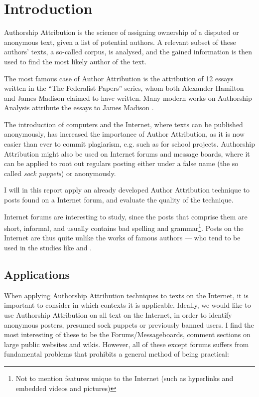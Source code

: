 \section{Introduction}
\label{introduction}
Authorship Attribution is the science of assigning ownership of a disputed or anonymous text, given a list of potential authors. A relevant subset of these authors' texts, a so-called corpus, is analysed, and the gained information is then used to find the most likely author of the text.

The most famous case of Author Attribution is the attribution of 12 essays written in the ``The Federalist Papers'' series, whom both Alexander Hamilton and James Madison claimed to have written. Many modern works on Authorship Analysis attribute the essays to James Madison \cite{Fung03thedisputed}.

The introduction of computers and the Internet, where texts can be published anonymously, has increased the importance of Author Attribution, as it is now easier than ever to commit plagiarism, e.g. such as for school projects. Authorship Attribution might also be used on Internet forums and message boards, where it can be applied to root out regulars posting either under a false name (the so called \emph{sock puppets}) or anonymously.

I will in this report apply an already developed Author Attribution technique to posts found on a Internet forum, and evaluate the quality of the technique.

Internet forums are interesting to study, since the posts that comprise them are short, informal, and usually contains bad spelling and grammar\footnote{Not to mention features unique to the Internet (such as hyperlinks and embedded videos and pictures)}. Posts on the Internet are thus quite unlike the works of famous authors --- who tend to be used in the studies like \cite{nr4} and \cite{nr2}.  

\subsection{Applications}
When applying Authorship Attribution techniques to texts on the Internet, it is important to consider in which contexts it is applicable. Ideally, we would like to use Authorship Attribution on all text on the Internet, in order to identify anonymous posters, presumed sock puppets or previously banned users. I find the most interesting of these to be the Forums/Messageboards, comment sections on large public websites and wikis. However, all of these except forums suffers from fundamental problems that prohibits a general method of being practical:

